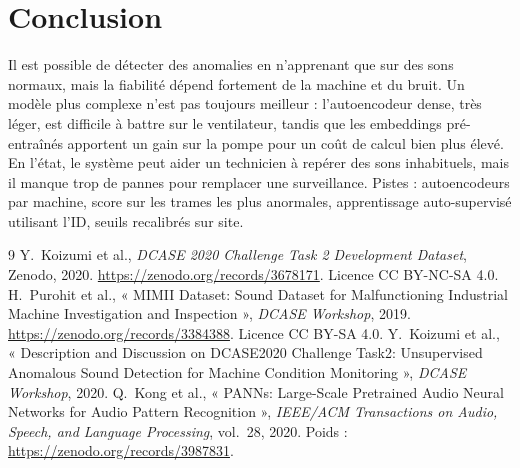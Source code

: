 \documentclass[11pt,a4paper]{article}
\begin{document}
\section{Conclusion}
Il est possible de détecter des anomalies en n'apprenant que sur des sons normaux, mais la fiabilité dépend fortement de la machine et du bruit.
Un modèle plus complexe n'est pas toujours meilleur : l'autoencodeur dense, très léger, est difficile à battre sur le ventilateur, tandis que les embeddings
pré-entraînés apportent un gain sur la pompe pour un coût de calcul bien plus élevé. En l'état, le système peut aider un technicien à
repérer des sons inhabituels, mais il manque trop de pannes pour remplacer une surveillance. Pistes : autoencodeurs par machine,
score sur les trames les plus anormales, apprentissage auto-supervisé utilisant l'ID, seuils recalibrés sur site.

\begin{thebibliography}{9}
 Y.~Koizumi et al., \emph{DCASE 2020 Challenge Task 2 Development Dataset}, Zenodo, 2020. \url{https://zenodo.org/records/3678171}. Licence CC BY-NC-SA 4.0.
 H.~Purohit et al., « MIMII Dataset: Sound Dataset for Malfunctioning Industrial Machine Investigation and Inspection », \emph{DCASE Workshop}, 2019. \url{https://zenodo.org/records/3384388}. Licence CC BY-SA 4.0.
 Y.~Koizumi et al., « Description and Discussion on DCASE2020 Challenge Task2: Unsupervised Anomalous Sound Detection for Machine Condition Monitoring », \emph{DCASE Workshop}, 2020.
 Q.~Kong et al., « PANNs: Large-Scale Pretrained Audio Neural Networks for Audio Pattern Recognition », \emph{IEEE/ACM Transactions on Audio, Speech, and Language Processing}, vol.~28, 2020. Poids : \url{https://zenodo.org/records/3987831}.
\end{thebibliography}
\end{document}

